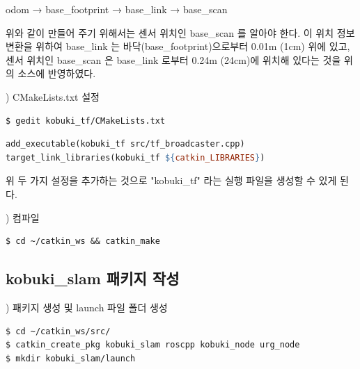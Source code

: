 odom → base\_footprint  → base\_link → base\_scan

위와 같이 만들어 주기 위해서는 센서 위치인 base\_scan 를 알아야 한다. 이 위치 정보 변환을 위하여 base\_link 는 바닥(base\_footprint)으로부터 0.01m (1cm) 위에 있고, 센서 위치인 base\_scan 은 base\_link 로부터 0.24m (24cm)에 위치해 있다는 것을 위의 소스에 반영하였다.

\vspace{\baselineskip}
\noindent
{}
\thenum) CMakeLists.txt 설정

\vspace{\baselineskip}
\begin{lstlisting}[language=ROS]
$ gedit kobuki_tf/CMakeLists.txt 
\end{lstlisting}


\vspace{\baselineskip}
\begin{lstlisting}[language=make]
add_executable(kobuki_tf src/tf_broadcaster.cpp)
target_link_libraries(kobuki_tf ${catkin_LIBRARIES})
\end{lstlisting}


위 두 가지 설정을 추가하는 것으로 "kobuki\_tf" 라는 실행 파일을 생성할 수 있게 된다.

\vspace{\baselineskip}
\noindent
{}
\thenum) 컴파일

\vspace{\baselineskip}
\begin{lstlisting}[language=ROS]
$ cd ~/catkin_ws && catkin_make
\end{lstlisting}



\subsection{kobuki\_slam 패키지 작성}

\setcounter{num}{0}

\vspace{\baselineskip}
\noindent
{}
\thenum) 패키지 생성 및 launch 파일 폴더 생성

\vspace{\baselineskip}
\begin{lstlisting}[language=ROS]
$ cd ~/catkin_ws/src/
$ catkin_create_pkg kobuki_slam roscpp kobuki_node urg_node
$ mkdir kobuki_slam/launch
\end{lstlisting}


